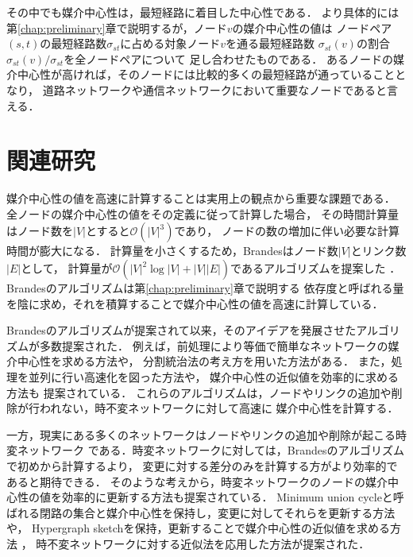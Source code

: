 その中でも媒介中心性\cite{Freeman1977}は，最短経路に着目した中心性である．
より具体的には第\ref{chap:preliminary}章で説明するが，ノード$v$の媒介中心性の値は
ノードペア$(s,t)$の最短経路数$\sigma_{st}$に占める対象ノード$v$を通る最短経路数
$\sigma_{st}(v)$の割合$\sigma_{st}(v)/\sigma_{st}$を全ノードペアについて
足し合わせたものである．
あるノードの媒介中心性が高ければ，そのノードには比較的多くの最短経路が通っていることとなり，
道路ネットワークや通信ネットワークにおいて重要なノードであると言える．

\section{関連研究}

媒介中心性の値を高速に計算することは実用上の観点から重要な課題である．
全ノードの媒介中心性の値をその定義に従って計算した場合，
その時間計算量はノード数を$|V|$とすると$\mathcal{O}(|V|^3)$であり，
ノードの数の増加に伴い必要な計算時間が膨大になる．
計算量を小さくするため，Brandesはノード数$|V|$とリンク数$|E|$として，
計算量が$\mathcal{O}(|V|^2\log|V|+|V||E|)$であるアルゴリズムを提案した
\cite{Brandes2001}．Brandesのアルゴリズムは第\ref{chap:preliminary}章で説明する
依存度と呼ばれる量を陰に求め，それを積算することで媒介中心性の値を高速に計算している．

Brandesのアルゴリズムが提案されて以来，そのアイデアを発展させたアルゴリズムが多数提案された．
例えば，前処理により等価で簡単なネットワークの媒介中心性を求める方法\cite{Puzis2012,Bentert2018}や，
分割統治法の考え方を用いた方法\cite{Erdos2015}がある．
また，処理を並列に行い高速化を図った方法\cite{Bader2006,Tan2009,Edmonds2010,Bernaschi2016}や，
媒介中心性の近似値を効率的に求める方法\cite{Brandes2007,Bader2007,Pfeffer2012,Yoshida2014}も
提案されている．
これらのアルゴリズムは，ノードやリンクの追加や削除が行われない，時不変ネットワークに対して高速に
媒介中心性を計算する．

一方，現実にある多くのネットワークはノードやリンクの追加や削除が起こる時変ネットワーク\cite{Holme2012}
である．時変ネットワークに対しては，Brandesのアルゴリズムで初めから計算するより，
変更に対する差分のみを計算する方がより効率的であると期待できる．
そのような考えから，時変ネットワークのノードの媒介中心性の値を効率的に更新する方法も提案されている．
Minimum union cycleと呼ばれる閉路の集合と媒介中心性を保持し，変更に対してそれらを更新する方法
\cite{Lee2012,Singh2015}や，
Hypergraph sketch\cite{Yoshida2014}を保持，更新することで媒介中心性の近似値を求める方法
\cite{Hayashi2015}，
時不変ネットワークに対する近似法を応用した方法\cite{Bergamini2015a,Bergamini2015b}が提案された．

